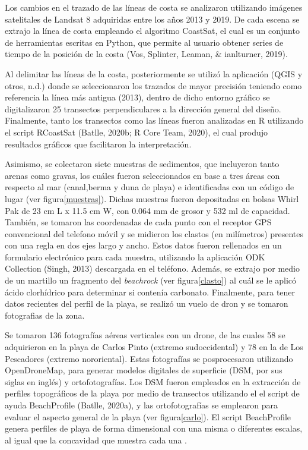 \documentclass[11pt,]{article}
\begin{document}
Los cambios en el trazado de las líneas de costa se analizaron
utilizando imágenes satelitales de Landsat 8 adquiridas entre los años
2013 y 2019. De cada escena se extrajo la línea de costa empleando el
algoritmo CoastSat, el cual es un conjunto de herramientas escritas en
Python, que permite al usuario obtener series de tiempo de la posición
de la costa (Vos, Splinter, Leaman, \& ianlturner, 2019).

Al delimitar las líneas de la costa, posteriormente se utilizó la
aplicación (QGIS y otros, n.d.) donde se seleccionaron los trazados de
mayor precisión teniendo como referencia la línea más antigua (2013),
dentro de dicho entorno gráfico se digitalizaron 25 transectos
perpendiculares a la dirección general del diseño. Finalmente, tanto los
transectos como las líneas fueron analizadas en R utilizando el script
RCoastSat (Batlle, 2020b; R Core Team, 2020), el cual produjo resultados
gráficos que facilitaron la interpretación.

Asimismo, se colectaron siete muestras de sedimentos, que incluyeron
tanto arenas como gravas, los cuáles fueron seleccionados en base a tres
áreas con respecto al mar (canal,berma y duna de playa) e identificadas
con un código de lugar (ver figura\ref{muestras}). Dichas muestras
fueron depositadas en bolsas Whirl Pak de 23 cm L x 11.5 cm W, con 0.064
mm de grosor y 532 ml de capacidad. También, se tomaron las coordenadas
de cada punto con el receptor GPS convencional del telefono móvil y se
midieron los clastos (en milímetros) presentes con una regla en dos ejes
largo y ancho. Estos datos fueron rellenados en un formulario
electrónico para cada muestra, utilizando la aplicación ODK Collection
(Singh, 2013) descargada en el teléfono. Además, se extrajo por medio de
un martillo un fragmento del \emph{beachrock} (ver figura\ref{clasto})
al cuál se le aplicó ácido clorhídrico para determinar si contenía
carbonato. Finalmente, para tener datos recientes del perfil de la
playa, se realizó un vuelo de dron y se tomaron fotografias de la zona.

Se tomaron 136 fotografías aéreas verticales con un drone, de las cuales
58 se adquirieron en la playa de Carlos Pinto (extremo sudoccidental) y
78 en la de Los Pescadores (extremo nororiental). Estas fotografías se
posprocesaron utilizando OpenDroneMap, para generar modelos digitales de
superficie (DSM, por sus siglas en inglés) y ortofotografías. Los DSM
fueron empleados en la extracción de perfiles topográficos de la playa
por medio de transectos utilizando el el script de ayuda BeachProfile
(Batlle, 2020a), y las ortofotografías se emplearon para evaluar el
aspecto general de la playa (ver figura\ref{carlo}). El script
BeachProfile genera perfiles de playa de forma dimensional con una misma
o diferentes escalas, al igual que la concavidad que muestra cada una .
\end{document}
